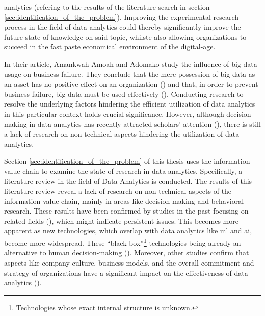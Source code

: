 analytics (refering to the results of the literature search in section \ref{sec:identification_of_the_problem}). Improving the experimental research process in the field of data analytics could thereby significantly improve the future state of knowledge on said topic, whilste also allowing organizations to succeed in the fast paste economical environment of the digital-age.

In their article, Amankwah-Amoah and Adomako study the influence of big data usage on business failure. They conclude that the mere possession of big data as an asset has no positive effect on an organization (\cite{AmankwahAmoah.2019}) and that, in order to prevent business failure, big data must be used effectively (\cite{AmankwahAmoah.2019}). Conducting research to resolve the underlying factors hindering the efficient utilization of data analytics in this particular context holds crucial significance. However, although decision-making in data analytics has recently attracted scholars' attention (\cite{Chen.2022}), there is still a lack of research on non-technical aspects hindering the utilization of data analytics.

Section \ref{sec:identification_of_the_problem} of this thesis uses the information value chain to examine the state of research in data analytics. Specifically, a literature review in the field of Data Analytics is conducted. The results of this literature review reveal a lack of research on non-technical aspects of the information value chain, mainly in areas like decision-making and behavioral research. These results have been confirmed by studies in the past focusing on related fields (\cite{Trieu.2017}), which might indicate persistent issues. This becomes more apparent as new technologies, which overlap with data analytics like \ac{ml} and \ac{ai}, become more widespread. These \enquote{black-box}\footnote{Technologies whose exact internal structure is unknown.} technologies being already an alternative to human decision-making (\cite{Krakowski.2023}). Moreover, other studies confirm that aspects like company culture, business models, and the overall commitment and strategy of organizations have a significant impact on the effectiveness of data analytics (\cite{Holsapple.2014}).

